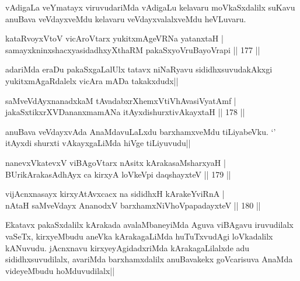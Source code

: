 \begin{artha}
vAdigaLa veYmatayx viruvudariMda vAdigaLu kelavaru moVkaSxdalilx suKavu anuBava veVdayxveMdu kelavaru veVdayxvalalxveMdu heVLuvaru.
\end{artha}

\begin{shl}
kataRvoyxV\s toV vicAroV\s tarx yukitxmAgeVRNa yatanxtaH |\\
samayxkninxshacxyasidadhxyXthaRM pakaSxyoVruBayoVrapi \hfill || 177 ||
\end{shl}

\begin{artha}
adariMda eraDu pakaSxgaLalUlx tatavx niNaRyavu sididhxsuvudakAkxgi yukitxmAgaRdalelx vicAra mADa takakxdudx||
\end{artha}

\begin{shl}
saMveVdAyxnanadxkaM tAvadabxrXhemxVtiVhAvasiVyatAmf |\\
jakaSxtikxrXVDananxmamANa itAyxdishurxtivAkayxtaH \hfill || 178 ||
\end{shl}

\begin{artha}
anuBava veVdayxvAda AnaMdavuLaLxdu barxhamxveMdu tiLiyabeVku. `\stext ' itAyxdi shurxti vAkayxgaLiMda hiVge tiLiyuvudu||
\end{artha}


\begin{shl}
nanevxVkatevxV viBAgoV\s tarx nAsitx kArakasaMsharxyaH |\\
BUrikArakasAdhAyx ca kirxyA loVkeV\s pi daqshayxteV \hfill || 179 ||
\end{shl}

\begin{shl}
vijAcnxnasayx kirxyAtAvxcacx na sididhxH kArakeYviRnA |\\
nAtaH saMveVdayx AnanodxV barxhamxNiVhoVpapadayxteV \hfill || 180 ||
\end{shl}

\begin{artha}%
Ekatavx pakaSxdalilx kArakada avalaMbaneyiMda Aguva viBAgavu iruvudilalx vaSeTx, kirxyeMbudu aneVka kArakagaLiMda huTuTxvudAgi loVkadalilx kANuvudu. jAcnxnavu kirxyeyAgidadxriMda kArakagaLilalxde adu sididhxsuvudilalx, avariMda barxhamxdalilx anuBavakekx goVcarisuva AnaMda videyeMbudu hoMduvudilalx||
\end{artha}


